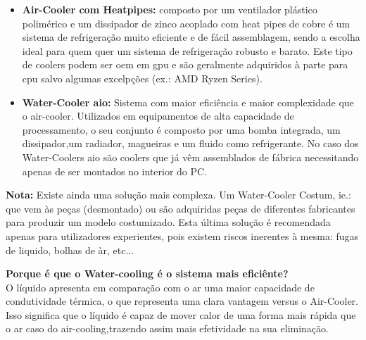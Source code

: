 \begin{itemize}
	\item \textbf{Air-Cooler com  Heatpipes:} composto por um ventilador plástico polimérico e um dissipador de zinco acoplado com heat pipes de cobre é um sistema de refrigeração muito eficiente e de fácil assemblagem, sendo a escolha ideal para quem quer um sistema de refrigeração robusto e barato. Este tipo de coolers podem ser \ac{oem} em \ac{gpu} e são geralmente adquiridos à parte para \ac{cpu} salvo algumas excelpções (ex.: AMD Ryzen Series).

	\item \textbf{Water-Cooler \ac{aio}:}  Sistema com maior eficiência e maior complexidade que o air-cooler. Utilizados em equipamentos de alta capacidade de processamento, o seu conjunto é composto por uma bomba integrada, um dissipador,um radiador, magueiras e um fluido como refrigerante. No caso dos Water-Coolers \ac{aio} são coolers que já vêm assemblados de fábrica necessitando apenas de ser montados no interior do PC. 
\end{itemize}

\textbf{Nota:} Existe ainda uma solução mais complexa. Um Water-Cooler Costum, ie.: que vem às peças (desmontado) ou são adquiridas peças de diferentes fabricantes para produzir um modelo costumizado. Esta última solução é recomendada apenas para utilizadores experientes, pois existem riscos inerentes à mesma: fugas de liquido, bolhas de àr, etc... \\

\begin{center}
\textbf{Porque é que o Water-cooling é o sistema mais eficiênte?}	\\
O líquido apresenta em comparação com o ar uma maior capacidade de condutividade térmica, o que representa uma clara vantagem versus o Air-Cooler. Isso significa que o líquido é capaz de mover calor de uma forma mais rápida que o ar caso do air-cooling,trazendo assim mais efetividade na sua eliminação.
\end{center}

